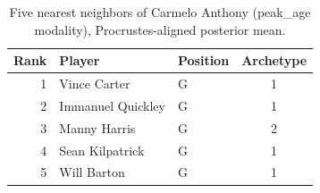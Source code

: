 \begin{table}[htbp]
  \centering\small
  \begin{tabular}{rllc}
    \toprule
    Rank & Player & Position & Archetype \\
    \midrule
    1 & Vince Carter & G & 1 \\
    2 & Immanuel Quickley & G & 1 \\
    3 & Manny Harris & G & 2 \\
    4 & Sean Kilpatrick & G & 1 \\
    5 & Will Barton & G & 1 \\
    \bottomrule
  \end{tabular}
  \caption{Five nearest neighbors of Carmelo Anthony (peak_age modality), Procrustes-aligned posterior mean.}
  \label{tab:Carmelo_Anthony_neighbors_peak_age}
\end{table}

